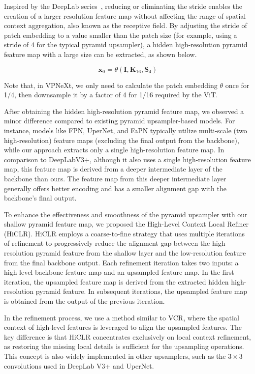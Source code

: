 Inspired by the DeepLab series~\cite{cDeepLab}, reducing or eliminating the stride enables the creation of a larger resolution feature map without affecting the range of spatial context aggregation, also known as the receptive field. 
%
By adjusting the stride of patch embedding to a value smaller than the patch size (for example, using a stride of 4 for the typical pyramid upsampler), a hidden high-resolution pyramid feature map with a large size can be extracted, as shown below.

\begin{equation}
    \mathbf{x}_{0} = \theta(\mathbf{I}, \mathbf{K}_{\text{16}}, \mathbf{S}_{\text{4}})
\end{equation}

Note that, in VPNeXt, we only need to calculate the patch embedding $\theta$ once for 1/4, then downsample it by a factor of 4 for 1/16 required by the ViT.

After obtaining the hidden high-resolution pyramid feature map, we observed a minor difference compared to existing pyramid upsampler-based models. 
%
For instance, models like FPN, UperNet, and FaPN typically utilize multi-scale (two high-resolution) feature maps (excluding the final output from the backbone), while our approach extracts only a single high-resolution feature map. 
%
In comparison to DeepLabV3+, although it also uses a single high-resolution feature map, this feature map is derived from a deeper intermediate layer of the backbone than ours. 
The feature map from this deeper intermediate layer generally offers better encoding and has a smaller alignment gap with the backbone's final output.

To enhance the effectiveness and smoothness of the pyramid upsampler with our shallow pyramid feature map, we proposed the High-Level Context Local Refiner (HiCLR).
%
HiCLR employs a coarse-to-fine strategy that uses multiple iterations of refinement to progressively reduce the alignment gap between the high-resolution pyramid feature from the shallow layer and the low-resolution feature from the final backbone output.
%
Each refinement iteration takes two inputs: a high-level backbone feature map and an upsampled feature map. In the first iteration, the upsampled feature map is derived from the extracted hidden high-resolution pyramid feature. 
%
In subsequent iterations, the upsampled feature map is obtained from the output of the previous iteration.

In the refinement process, we use a method similar to VCR, where the spatial context of high-level features is leveraged to align the upsampled features. The key difference is that HiCLR concentrates exclusively on local context refinement, as restoring the missing local details is sufficient for the upsampling operations. 
%
This concept is also widely implemented in other upsamplers, such as the $3\times3$ convolutions used in DeepLab V3+ and UperNet.